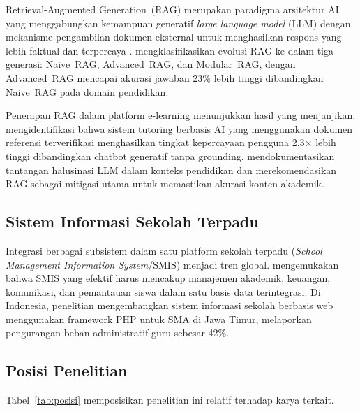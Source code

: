 \documentclass[12pt,a4paper]{article}
\begin{document}
Retrieval-Augmented Generation~(RAG) merupakan paradigma arsitektur
AI yang menggabungkan kemampuan generatif \textit{large language model}
(LLM) dengan mekanisme pengambilan dokumen eksternal untuk menghasilkan
respons yang lebih faktual dan terpercaya
\citep{lewis2020retrieval}.
\citet{gao2023retrieval} mengklasifikasikan evolusi RAG ke dalam tiga
generasi: Naive~RAG, Advanced~RAG, dan Modular~RAG, dengan
Advanced~RAG mencapai akurasi jawaban 23\% lebih tinggi dibandingkan
Naive~RAG pada domain pendidikan.

Penerapan RAG dalam platform e-learning menunjukkan hasil yang
menjanjikan. \citet{chen2020ai} mengidentifikasi bahwa sistem tutoring
berbasis AI yang menggunakan dokumen referensi terverifikasi
menghasilkan tingkat kepercayaan pengguna 2,3$\times$ lebih tinggi
dibandingkan chatbot generatif tanpa grounding.
\citet{kasneci2023chatgpt} mendokumentasikan tantangan halusinasi LLM
dalam konteks pendidikan dan merekomendasikan RAG sebagai mitigasi
utama untuk memastikan akurasi konten akademik.

\subsection{Sistem Informasi Sekolah Terpadu}

Integrasi berbagai subsistem dalam satu platform sekolah terpadu
(\textit{School Management Information System}/SMIS) menjadi tren
global.
\citet{moswela2016educational} mengemukakan bahwa SMIS yang efektif
harus mencakup manajemen akademik, keuangan, komunikasi, dan
pemantauan siswa dalam satu basis data terintegrasi.
Di Indonesia, penelitian \citet{purnomo2022pengembangan} mengembangkan
sistem informasi sekolah berbasis web menggunakan framework PHP
untuk SMA di Jawa Timur, melaporkan pengurangan beban administratif
guru sebesar 42\%.

\subsection{Posisi Penelitian}

Tabel~\ref{tab:posisi} memposisikan penelitian ini relatif terhadap
karya terkait.
\end{document}
